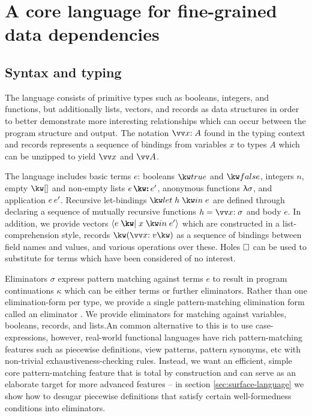 \section{A core language for fine-grained data dependencies}
\label{sec:core-language}

\subsection{Syntax and typing}


The language consists of primitive types such as booleans, integers, and functions, but additionally lists, vectors, and records as data structures in order to better demonstrate more interesting relationships which can occur between the program structure and output. The notation $\seq{\bind{x}{A}}$ found in the typing context and records represents a sequence of bindings from variables $x$ to types $A$ which can be unzipped to yield $\seq{x}$ and $\seq{A}$.



The language includes basic terms $e$: booleans $\exTrue$ and $\exFalse$, integers $n$, empty $\exNil$ and non-empty lists $\exCons{e}{e'}$, anonymous functions $\uplambda{\sigma}$, and application ${e}\,{e'}$. Recursive let-bindings $\exLetRecMutual{h}{e}$ are defined through declaring a sequence of mutually recursive functions $h = \seq{\bind{x}{\sigma}}$ and body $e$. In addition, we provide vectors $\exVec{e}{x}{e'}$ which are constructed in a list-comprehension style, records $\exRec{\vec{\bind{x}{v}}}$ as a sequence of bindings between field names and values, and various operations over these. Holes $\square$ can be used to substitute for terms which have been considered of no interest.

Eliminators $\sigma$ express pattern matching against terms $e$ to result in program continuations $\kappa$ which can be either terms or further eliminators. Rather than one elimination-form per type, we provide a single pattern-matching elimination form called an eliminator \cite{hinze00}. We provide eliminators for matching against variables, booleans, records, and lists.An common alternative to this is to use case-expressions, however, real-world functional languages have rich pattern-matching features such as piecewise definitions, view patterns, pattern synonyms, etc with non-trivial exhaustiveness-checking rules. Instead, we want an efficient, simple core pattern-matching feature that is total by construction and can serve as an elaborate target for more advanced features -- in section \ref{sec:surface-language} we show how to desugar piecewise definitions that satisfy certain well-formedness conditions into eliminators. 

